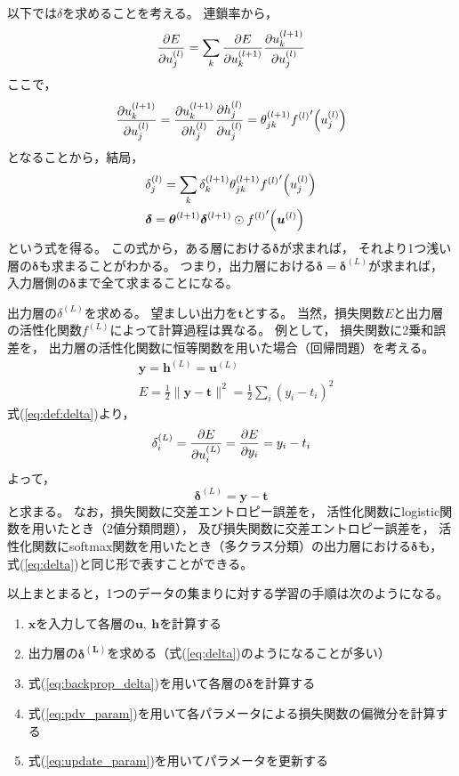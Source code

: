 \documentclass[class=jsarticle, crop=false, dvipdfmx, fleqn]{standalone}
\begin{document}
以下では$\delta$を求めることを考える。
連鎖率から，
\begin{equation}
\pdv{E}{u_j^{(l)}} = \sum_k \pdv{E}{u_k^{(l+1)}} \pdv{u_k^{(l+1)}}{u_{j}^{(l)}}
\end{equation}
ここで，
\begin{equation}
\pdv{u_k^{(l+1)}}{u_{j}^{(l)}}
	= \pdv{u_k^{(l+1)}}{h_{j}^{(l)}} \pdv{h_j^{(l)}}{u_{j}^{(l)}}
	= \theta_{jk}^{(l+1)} {f^{(l)}}^\prime \qty(u_{j}^{(l)})
\end{equation}
となることから，結局，
\begin{align}
& \delta_j^{(l)} = \sum_k \delta_k^{(l+1)} \theta_{jk}^{(l+1)} {f^{(l)}}^\prime \qty(u_{j}^{(l)}) \\
& \bm{\delta} = \bm{\theta}^{(l+1)} \bm{\delta}^{(l+1)} \odot {f^{(l)}}^\prime \qty(\bm{u}^{(l)})
\label{eq:backprop_delta}
\end{align}
という式を得る。
この式から，ある層における$\bm{\delta}$が求まれば，
それより1つ浅い層の$\bm{\delta}$も求まることがわかる。
つまり，出力層における$\bm{\delta} = \bm{\delta}^{(L)}$が求まれば，
入力層側の$\bm{\delta}$まで全て求まることになる。

出力層の$\delta^{(L)}$を求める。
望ましい出力を$\bm{t}$とする。
当然，損失関数$E$と出力層の活性化関数$f^{(L)}$によって計算過程は異なる。
例として，
損失関数に2乗和誤差を，
出力層の活性化関数に恒等関数を用いた場合（回帰問題）を考える。
\begin{align}
& \bm{y} = \bm{h}^{(L)} = \bm{u}^{(L)} \\
& E = \frac{1}{2} \| \bm{y} - \bm{t} \|^2 = \frac{1}{2} \sum_i (y_i - t_i)^2
\end{align}
式(\ref{eq:def:delta})より，
\begin{equation}
\delta_i^{(L)} = \pdv{E}{u_i^{(L)}} = \pdv{E}{y_i} = y_i - t_i
\end{equation}
よって，
\begin{equation}
\bm{\delta}^{(L)} = \bm{y - t}
\label{eq:delta}
\end{equation}
と求まる。
なお，損失関数に交差エントロピー誤差を，
活性化関数にlogistic関数を用いたとき（2値分類問題），
及び損失関数に交差エントロピー誤差を，
活性化関数にsoftmax関数を用いたとき（多クラス分類）の出力層における$\bm{\delta}$も，
式(\ref{eq:delta})と同じ形で表すことができる。

以上まとまると，1つのデータの集まりに対する学習の手順は次のようになる。

\begin{enumerate}
\item $\bm{x}$を入力して各層の$\bm{u},\ \bm{h}$を計算する
\item 出力層の$\bm{\delta^{(L)}}$を求める（式(\ref{eq:delta})のようになることが多い）
\item 式(\ref{eq:backprop_delta})を用いて各層の$\bm{\delta}$を計算する
\item 式(\ref{eq:pdv_param})を用いて各パラメータによる損失関数の偏微分を計算する
\item 式(\ref{eq:update_param})を用いてパラメータを更新する
\end{enumerate}
\end{document}
